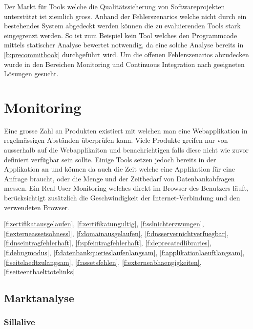 
Der Markt für Tools welche die Qualitätssicherung von Softwareprojekten unterstützt ist ziemlich gross. Anhand der Fehlerszenarios welche nicht durch ein bestehendes System abgedeckt werden können die zu evaluierenden Tools stark eingegrenzt werden. So ist zum Beispiel kein Tool welches den Programmcode mittels statischer Analyse bewertet notwendig, da eine solche Analyse bereits in \ref{b:precommithook} durchgeführt wird. Um die offenen Fehlerszenarios abzudecken wurde in den Bereichen Monitoring und Continuous Integration nach geeigneten Lösungen gesucht.

\section{Monitoring}
\label{sec:monitoring_evaluation}
Eine grosse Zahl an Produkten existiert mit welchen man eine Webapplikation in regelmässigen Abständen überprüfen kann. Viele Produkte greifen nur von ausserhalb auf die Webapplikaiton und benachrichtigen falls diese nicht wie zuvor definiert verfügbar sein sollte. Einige Tools setzen jedoch bereits in der Applikation an und können da auch die Zeit welche eine Applikation für eine Anfrage braucht, oder die Menge und der Zeitbedarf von Datenbankabfragen messen. Ein Real User Monitoring welches direkt im Browser des Benutzers läuft, berücksichtigt zusätzlich die Geschwindigkeit der Internet-Verbindung und den verwendeten Browser.

\ref{f:zertifikatausgelaufen}, \ref{f:zertifikatungultig}, \ref{f:sslnichterzwungen}, \ref{f:externeassetsohnessl}, \ref{f:domainausgelaufen}, \ref{f:dnsservernichtverfuegbar}, \ref{f:dnseintragfehlerhaft}, \ref{f:spfeintragfehlerhaft}, \ref{f:deprecatedlibraries}, \ref{f:debugmodus}, \ref{f:datenbankquerieslaufenlangsam}, \ref{f:applikationlaeuftlangsam}, \ref{f:seitelaedtzulangsam}, \ref{f:assetsfehlen}, \ref{f:externeabhaengigkeiten}, \ref{f:seiteenthaelttotelinks}

\subsection{Marktanalyse}
\label{sub:marktanalyse}

\subsubsection{Sillalive}
\label{ssub:sillalive}

